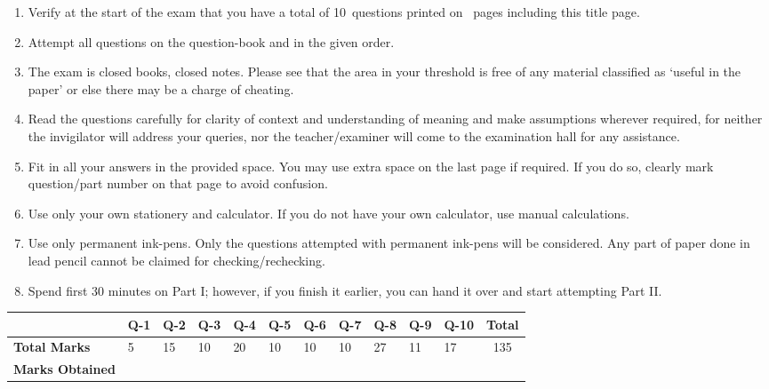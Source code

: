 \documentclass[12pt,a4paper]{article}
\newcommand\TotalMarks{135}
\newcommand\TotalQuestions{10}
\newcommand\TotalPages{\pageref{LastPage}} %
\def\Qone{5}
\def\Qtwo{15}
\def\Qthree{10}
\def\Qfour{20}
\def\Qfive{10}
\def\Qsix{10}
\def\Qseven{10}
\def\Qeight{27}
\def\Qnine{11}
\def\Qten{17}
\begin{document}
\begin{enumerate}
\itemsep0em
\item Verify at the start of the exam that you have a total of \TotalQuestions~questions printed on \TotalPages~pages including this title page.
\item Attempt all questions on the question-book and in the given order.
\item The exam is closed books, closed notes. Please see that the area in your threshold is free of any material classified as `useful in the paper' or else there may be a charge of cheating.
\item Read the questions carefully for clarity of context and understanding of meaning and make assumptions wherever required, for neither the invigilator will address your queries, nor the teacher/examiner will come to the examination hall for any assistance.
\item Fit in all your answers in the provided space. You may use extra space on the last page if required. If you do so, clearly mark question/part number on that page to avoid confusion. 
\item Use only your own stationery and calculator. If you do not have your own calculator, use manual calculations. 
\item Use only permanent ink-pens. Only the questions attempted with permanent ink-pens will be considered. Any part of paper done in lead pencil cannot be claimed for checking/rechecking.
\item Spend first 30 minutes on Part I; however, if you finish it earlier, you can hand it over and start attempting Part II.
\end{enumerate}
\begin{table}[H]
\begin{center}
\vspace{0.3cm}
	{\footnotesize \begin{tabular}{|C{1.8cm}|C{0.75cm}|C{0.75cm}|C{0.75cm}|C{0.75cm}|C{0.75cm}|C{0.75cm}|C{0.75cm}|C{0.75cm}|C{0.75cm}|C{0.75cm}|c|}
	\hline
		\rule{0pt}{4.6ex} & Q-1 & Q-2 & Q-3 & Q-4 & Q-5 & Q-6 & Q-7 & Q-8 & Q-9 & Q-10 & \textbf{Total}\\[-0.5ex]
		\hline
		\rule{0pt}{2.6ex}\textbf{Total Marks}& \Qone & \Qtwo & \Qthree & \Qfour & \Qfive & \Qsix & \Qseven & \Qeight & \Qnine & \Qten & \TotalMarks\\
		\hline
		\rule{0pt}{2.6ex}\textbf{Marks Obtained}& & & & & & & & & & &\\
	\hline
	\end{tabular}}
\end{center}
\end{table}
\end{document}
